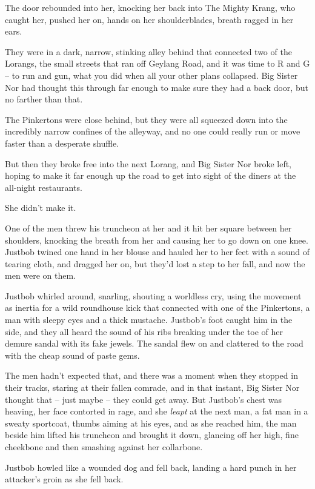 The door rebounded into her, knocking her back into The Mighty
Krang, who caught her, pushed her on, hands on her shoulderblades,
breath ragged in her ears.

They were in a dark, narrow, stinking alley behind that connected
two of the Lorangs, the small streets that ran off Geylang Road,
and it was time to R and G -- to run and gun, what you did when all
your other plans collapsed. Big Sister Nor had thought this through
far enough to make sure they had a back door, but no farther than
that.

The Pinkertons were close behind, but they were all squeezed down
into the incredibly narrow confines of the alleyway, and no one
could really run or move faster than a desperate shuffle.

But then they broke free into the next Lorang, and Big Sister Nor
broke left, hoping to make it far enough up the road to get into
sight of the diners at the all-night restaurants.

She didn't make it.

One of the men threw his truncheon at her and it hit her square
between her shoulders, knocking the breath from her and causing her
to go down on one knee. Justbob twined one hand in her blouse and
hauled her to her feet with a sound of tearing cloth, and dragged
her on, but they'd lost a step to her fall, and now the men were on
them.

Justbob whirled around, snarling, shouting a worldless cry, using
the movement as inertia for a wild roundhouse kick that connected
with one of the Pinkertons, a man with sleepy eyes and a thick
mustache. Justbob's foot caught him in the side, and they all heard
the sound of his ribs breaking under the toe of her demure sandal
with its fake jewels. The sandal flew on and clattered to the road
with the cheap sound of paste gems.

The men hadn't expected that, and there was a moment when they
stopped in their tracks, staring at their fallen comrade, and in
that instant, Big Sister Nor thought that -- just maybe -- they
could get away. But Justbob's chest was heaving, her face contorted
in rage, and she \emph{leapt} at the next man, a fat man in a
sweaty sportcoat, thumbs aiming at his eyes, and as she reached
him, the man beside him lifted his truncheon and brought it down,
glancing off her high, fine cheekbone and then smashing against her
collarbone.

Justbob howled like a wounded dog and fell back, landing a hard
punch in her attacker's groin as she fell back.

